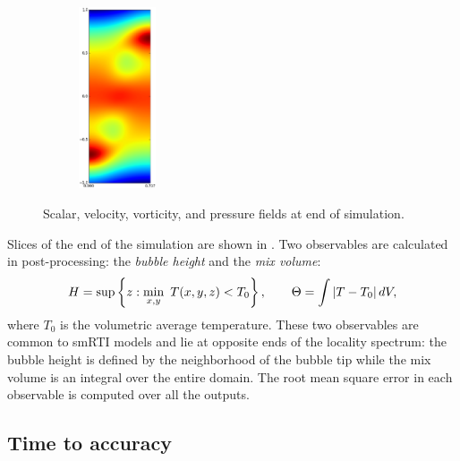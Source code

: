\begin{figure}
\begin{subfigure}[b]{0.25\textwidth}
\end{subfigure}
\begin{subfigure}[b]{0.25\textwidth}
\includegraphics[width=0.25\textwidth]{gfx/cnv_o16_e32-p_yz-0033}
\end{subfigure}
\caption{ 
Scalar, velocity, vorticity, and pressure fields at end of simulation.
}
\end{figure}

Slices of the end of the simulation are shown in .
Two observables are calculated in post-processing: the \textit{bubble height} and the \textit{mix volume}:
\begin{equation} \elabel{observe}
H = \sup \left\{ z : \min_{x,y} ~ T(x,y,z) < T_0\right\}, \qquad
\Theta = \int \left|T - T_0\right| dV, 
\end{equation}
where $T_0$ is the volumetric average temperature.
These two observables are common to smRTI models and lie at opposite ends of the locality spectrum: 
the bubble height is defined by the neighborhood of the bubble tip while the mix volume is an integral over the entire domain.
The root mean square error in each observable is computed over all the outputs.


\subsection{Time to accuracy}

